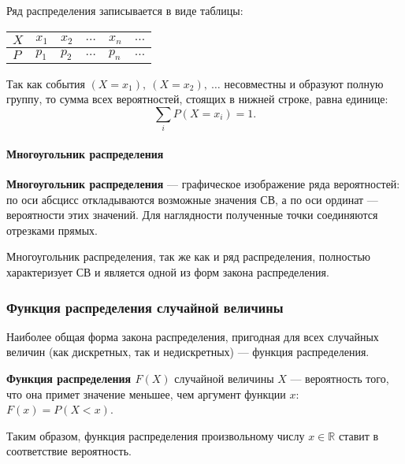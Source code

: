 \documentclass[a4paper]{article}
\newcommand{\key}[1]{{\color{Medium}\bfseries #1}}
\begin{document}
                Ряд распределения записывается в виде таблицы:

                \begin{tabular}{*{6}{|C{1.8cm}}|}
                    \hline
                    $X$ & $x_1$ & $x_2$ & $\ldots$ & $x_n$ & $\ldots$ \\
                    \hline
                    $P $ & $p_1$ & $p_2$ & $\ldots$ & $p_n$ & $\ldots$ \\
                    \hline
                \end{tabular}

                Так как события $(X = x_1) , \: (X = x_2) , \: \ldots$ несовместны и образуют полную группу, то сумма всех вероятностей, стоящих в нижней строке, равна единице:
                \begin{equation*}
                    \sum\limits_{i} P(X = x_i) = 1 .
                \end{equation*}

                \paragraph{Многоугольник распределения}

                    \key{Многоугольник распределения} --- графическое изображение ряда вероятностей: по оси абсцисс откладываются возможные значения СВ, а по оси ординат --- вероятности этих значений. Для наглядности полученные точки соединяются отрезками прямых.
                    
                    Многоугольник распределения, так же как и ряд распределения, полностью характеризует СВ и является одной из форм закона распределения.

            \subsubsection{Функция распределения случайной величины}

                Наиболее общая форма закона распределения, пригодная для всех случайных величин (как дискретных, так и недискретных) --- функция распределения.
                
                \key{Функция распределения \boldmath$F(X)$} случайной величины $X$ --- вероятность того, что она примет значение меньшее, чем аргумент функции $x$: $F(x) = P(X < x)$.

                Таким образом, функция распределения произвольному числу $x \in \mathbb{R}$ ставит в соответствие вероятность.
                
\end{document}
